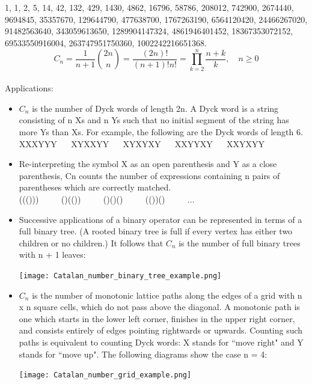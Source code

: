 \documentclass[10pt, twocolumn]{article}
\begin{document}
\begin{flushleft}
1, 1, 2, 5, 14, 42, 132, 429, 1430, 4862, 16796, 58786, 208012, 742900, 2674440, 9694845, 35357670, 129644790, 477638700, 1767263190, 6564120420, 24466267020, 91482563640, 343059613650, 1289904147324, 4861946401452, 18367353072152, 69533550916004, 263747951750360, 1002242216651368.\\

$$C_n = \frac{1}{n+1}\binom{2n}{n} = \frac{(2n)!}{(n+1)!n!} = \prod_{k=2}^{n} \frac{n+k}{k}, \quad n \geq 0$$\\


Applications:
\begin{itemize}
\item $C_n$ is the number of Dyck words of length 2n. A Dyck word is a string consisting of n Xs and n Ys such that no initial segment of the string has more Ys than Xs. For example, the following are the Dyck words of length 6.\\
XXXYYY  $\quad$  XYXXYY  $\quad$  XYXYXY  $\quad$  XXYYXY  $\quad$  XXYXYY


\item Re-interpreting the symbol X as an open parenthesis and Y as a close parenthesis, Cn counts the number of expressions containing n pairs of parentheses which are correctly matched.\\
((()))  $\qquad$  ()(())  $\qquad$  ()()()  $\qquad$  (())()  $\qquad$  ...


\item Successive applications of a binary operator can be represented in terms of a full binary tree. (A rooted binary tree is full if every vertex has either two children or no children.) It follows that $C_n$ is the number of full binary trees with n + 1 leaves:\\
\begin{center}
\texttt{[image: Catalan\_number\_binary\_tree\_example.png]}
\end{center}


\item $C_n$ is the number of monotonic lattice paths along the edges of a grid with n x n square cells, which do not pass above the diagonal. A monotonic path is one which starts in the lower left corner, finishes in the upper right corner, and consists entirely of edges pointing rightwards or upwards. Counting such paths is equivalent to counting Dyck words: X stands for ``move right" and Y stands for ``move up".
The following diagrams show the case n = 4:
\begin{center}
\texttt{[image: Catalan\_number\_grid\_example.png]}
\end{center}



\end{itemize}
\end{flushleft}
\end{document}
